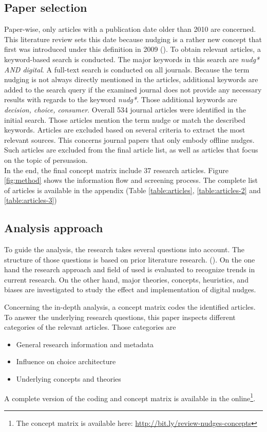 \subsection{Paper selection}
Paper-wise, only articles with a publication date older than 2010 are concerned. This literature review sets this date because nudging is a rather new concept that first was introduced under this definition in 2009 (\cite{thaler_nudge:_2009}). To obtain relevant articles, a keyword-based search is conducted. The major keywords in this search are \textit{nudg* AND digital}. A full-text search is conducted on all journals. Because the term nudging is not always directly mentioned in the articles, additional keywords are added to the search query if the examined journal does not provide any necessary results with regards to the keyword \textit{nudg*}. Those additional keywords are \textit{decision, choice, consumer}. Overall 534 journal articles were identified in the initial search. Those articles mention the term nudge or match the described keywords. Articles are excluded based on several criteria to extract the most relevant sources. This concerns journal papers that only embody offline nudges. Such articles are excluded from the final article list, as well as articles that focus on the topic of persuasion. 
\\
In the end, the final concept matrix include 37 research articles. Figure \ref{fig:method} shows the information flow and screening process. The complete list of articles is available in the appendix (Table \ref{table:articles}, \ref{table:articles-2} and \ref{table:articles-3})

\subsection{Analysis approach}
To guide the analysis, the research takes several questions into account. The structure of those questions is based on prior literature research. (\cite{alavi_review_1992}). On the one hand the research approach and field of used is evaluated to recognize trends in current research. On the other hand, major theories, concepts, heuristics, and biases are investigated to study the effect and implementation of digital nudges.

Concerning the in-depth analysis, a concept matrix codes the identified articles. To answer the underlying research questions, this paper inspects different categories of the relevant articles. Those categories are 
\begin{itemize}
\item General research information and metadata
\item Influence on choice architecture
\item Underlying concepts and theories
\end{itemize}

A complete version of the coding and concept matrix is available in the online\footnote{The concept matrix is available here: \url{http://bit.ly/review-nudges-concepts}}.